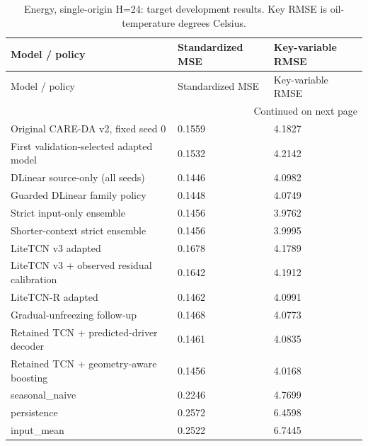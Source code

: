 {\footnotesize
\setlength{\tabcolsep}{3pt}
\renewcommand{\arraystretch}{1.17}
\begin{longtable}{@{}p{}p{}p{}@{}}
\caption{Energy, single-origin H=24: target development results. Key RMSE is oil-temperature degrees Celsius.}\label{tab:long_energy}\\
\toprule
Model / policy & Standardized MSE & Key-variable RMSE \\
\midrule\endfirsthead
Model / policy & Standardized MSE & Key-variable RMSE \\
\midrule\endhead
\midrule\multicolumn{3}{r}{Continued on next page}\\\endfoot
\bottomrule\endlastfoot
Original CARE-DA v2, fixed seed 0 & 0.1559 & 4.1827 \\
First validation-selected adapted model & 0.1532 & 4.2142 \\
DLinear source-only (all seeds) & 0.1446 & 4.0982 \\
Guarded DLinear family policy & 0.1448 & 4.0749 \\
Strict input-only ensemble & 0.1456 & 3.9762 \\
Shorter-context strict ensemble & 0.1456 & 3.9995 \\
LiteTCN v3 adapted & 0.1678 & 4.1789 \\
LiteTCN v3 + observed residual calibration & 0.1642 & 4.1912 \\
LiteTCN-R adapted & 0.1462 & 4.0991 \\
Gradual-unfreezing follow-up & 0.1468 & 4.0773 \\
Retained TCN + predicted-driver decoder & 0.1461 & 4.0835 \\
Retained TCN + geometry-aware boosting & 0.1456 & 4.0168 \\
seasonal\_\allowbreak{}naive & 0.2246 & 4.7699 \\
persistence & 0.2572 & 6.4598 \\
input\_\allowbreak{}mean & 0.2522 & 6.7445 \\
\end{longtable}
}
